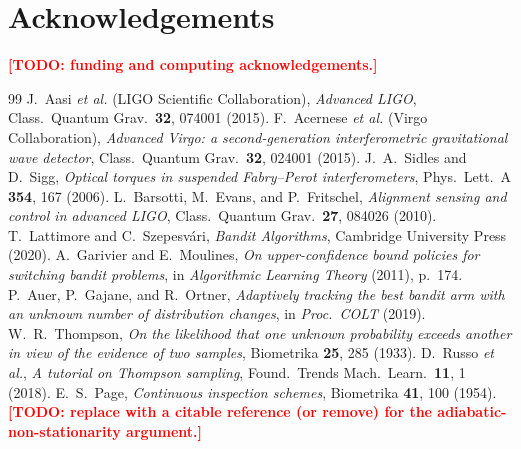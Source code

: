 \documentclass[11pt,a4paper]{article}
\newcommand{\todo}[1]{\textcolor{red}{\textbf{[TODO: #1]}}}
\begin{document}
\section*{Acknowledgements}
\todo{funding and computing acknowledgements.}

\begin{thebibliography}{99}
 J.~Aasi \emph{et al.} (LIGO Scientific Collaboration),
  \emph{Advanced LIGO}, Class.\ Quantum Grav.\ \textbf{32}, 074001 (2015).
 F.~Acernese \emph{et al.} (Virgo Collaboration),
  \emph{Advanced Virgo: a second-generation interferometric gravitational wave
  detector}, Class.\ Quantum Grav.\ \textbf{32}, 024001 (2015).
 J.~A.~Sidles and D.~Sigg,
  \emph{Optical torques in suspended Fabry--Perot interferometers},
  Phys.\ Lett.\ A \textbf{354}, 167 (2006).
 L.~Barsotti, M.~Evans, and P.~Fritschel,
  \emph{Alignment sensing and control in advanced LIGO},
  Class.\ Quantum Grav.\ \textbf{27}, 084026 (2010).
 T.~Lattimore and C.~Szepesv\'ari,
  \emph{Bandit Algorithms}, Cambridge University Press (2020).
 A.~Garivier and E.~Moulines,
  \emph{On upper-confidence bound policies for switching bandit problems},
  in \emph{Algorithmic Learning Theory} (2011), p.~174.
 P.~Auer, P.~Gajane, and R.~Ortner,
  \emph{Adaptively tracking the best bandit arm with an unknown number of
  distribution changes}, in \emph{Proc.\ COLT} (2019).
 W.~R.~Thompson,
  \emph{On the likelihood that one unknown probability exceeds another in view
  of the evidence of two samples}, Biometrika \textbf{25}, 285 (1933).
 D.~Russo \emph{et al.},
  \emph{A tutorial on Thompson sampling},
  Found.\ Trends Mach.\ Learn.\ \textbf{11}, 1 (2018).
 E.~S.~Page,
  \emph{Continuous inspection schemes}, Biometrika \textbf{41}, 100 (1954).
 \todo{replace with a citable reference (or remove)
  for the adiabatic-non-stationarity argument.}
\end{thebibliography}
\end{document}
